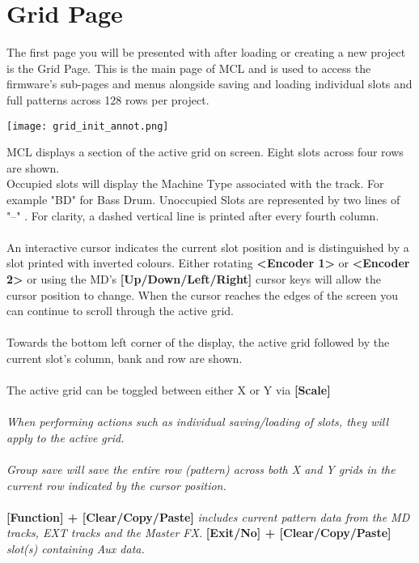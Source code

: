 
\chapter{Grid Page}
The first page you will be presented with after loading or creating a new project is the Grid Page. This is the main page of MCL and is used to access the firmware's sub-pages and menus alongside saving and loading individual slots and full patterns across 128 rows per project.

\begin{center}
	\texttt{[image: grid\_init\_annot.png]}
\end{center}
MCL displays a section of the active grid on screen. 
Eight slots across four rows are shown.\\
Occupied slots will display the Machine Type associated with the track. For example "BD" for Bass Drum. Unoccupied Slots are represented by two lines of "--" . For clarity, a dashed vertical line is printed after every fourth column.\\\\
An interactive cursor indicates the current slot position and is distinguished by a slot printed with inverted colours. Either rotating \textbf{<Encoder 1>} or \textbf{<Encoder 2> } or using the MD's \textbf{ [Up/Down/Left/Right]} cursor keys will allow the cursor position to change. When the cursor reaches the edges of the screen you can continue to scroll through the active grid.
\\\\
Towards the bottom left corner of the display, the active grid followed by the current slot's column, bank and row are shown.\\\\
The active grid can be toggled between either X or Y via \textbf{[Scale]} \\\\
\textit{When performing actions such as individual saving/loading of slots, they will apply to the active grid. \\\\ Group save will save the entire row (pattern) across both X and Y grids in the current row indicated by the cursor position. }\\\\\textbf{[Function] + [Clear/Copy/Paste]} \textit{includes current pattern data from the MD tracks, EXT tracks and the Master FX.} \textbf{ [Exit/No] + [Clear/Copy/Paste]} \textit{slot(s) containing Aux data.}
